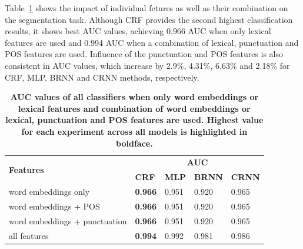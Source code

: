 \documentclass{amia}
\begin{document}
Table~\ref{tab:result_roc} shows the impact of individual fetures as well as their combination on the segmentation task. Although CRF provides the second highest classification results, it shows best AUC values, achieving 0.966 AUC when only lexical features are used and 0.994 AUC when a combination of lexical, punctuation and POS features are used. Influence of the punctuation and POS features is also consistent in AUC values, which increase by 2.9\%, 4.31\%, 6.63\% and 2.18\% for CRF, MLP, BRNN and CRNN methods, respectively.\\

\begin{table}[ht]
\centering
\caption{\textbf{AUC values of all classifiers when only word embeddings or lexical features and combination of word embeddings or lexical, punctuation and POS features are used. Highest value for each experiment across all models is highlighted in boldface.}}
\label{tab:result_roc}
 \begin{tabular}{|l|l|l|l|l|}
  \hline
\multirow{2}{*}{\textbf{Features}} & \multicolumn{4}{|c|}{\textbf{AUC}} \\\cline{2-5}
 & \textbf{CRF} & \textbf{MLP}  & \textbf{BRNN} & \textbf{CRNN} \\ \hline      
 word embeddings only & \textbf{0.966} & 0.951 & 0.920 & 0.965 \\ \hline
 word embeddings + POS & \textbf{0.966} & 0.951 & 0.920 & 0.965 \\ \hline
 word embeddings + punctuation & \textbf{0.966} & 0.951 & 0.920 & 0.965 \\ \hline
 all features & \textbf{0.994} & 0.992 & 0.981 & 0.986 \\ \hline
  \end{tabular}
\end{table}      

\end{document}
